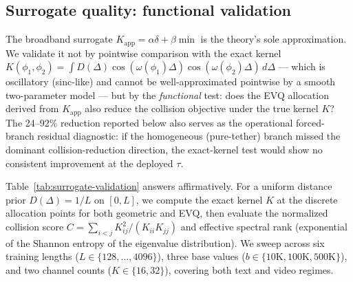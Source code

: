 \subsection{Surrogate quality: functional validation}
\label{sec:surrogate-validation}

The broadband surrogate $K_{\mathrm{app}} = \alpha\delta + \beta\min$ is the theory's sole approximation. We validate it not by pointwise comparison with the exact kernel $K(\phi_1,\phi_2) = \int D(\Delta)\cos(\omega(\phi_1)\Delta)\cos(\omega(\phi_2)\Delta)\,d\Delta$ --- which is oscillatory (sinc-like) and cannot be well-approximated pointwise by a smooth two-parameter model --- but by the \emph{functional} test: does the EVQ allocation derived from $K_{\mathrm{app}}$ also reduce the collision objective under the true kernel $K$? The 24--92\% reduction reported below also serves as the operational forced-branch residual diagnostic: if the homogeneous (pure-tether) branch missed the dominant collision-reduction direction, the exact-kernel test would show no consistent improvement at the deployed $\tau$.

Table~\ref{tab:surrogate-validation} answers affirmatively. For a uniform distance prior $D(\Delta) = 1/L$ on $[0, L]$, we compute the exact kernel $K$ at the discrete allocation points for both geometric and EVQ, then evaluate the normalized collision score $C = \sum_{i<j} K_{ij}^2/(K_{ii}K_{jj})$ and effective spectral rank (exponential of the Shannon entropy of the eigenvalue distribution). We sweep across six training lengths ($L \in \{128, \ldots, 4096\}$), three base values ($b \in \{10\mathrm{K}, 100\mathrm{K}, 500\mathrm{K}\}$), and two channel counts ($K \in \{16, 32\}$), covering both text and video regimes.

